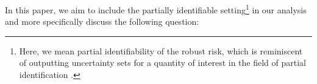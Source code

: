 In this paper, we aim to include the partially identifiable setting\footnote{Here, we mean partial identifiability of the robust risk, which is reminiscent of outputting uncertainty sets for a quantity of interest in the field of partial identification \cite{tamer2010partial, frake2023perfect}.} in our analysis and more specifically discuss the following question:

